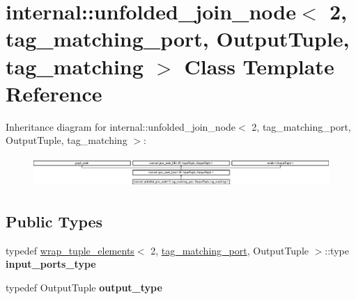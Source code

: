 \hypertarget{classinternal_1_1unfolded__join__node_3_012_00_01tag__matching__port_00_01OutputTuple_00_01tag__matching_01_4}{}\section{internal\+:\+:unfolded\+\_\+join\+\_\+node$<$ 2, tag\+\_\+matching\+\_\+port, Output\+Tuple, tag\+\_\+matching $>$ Class Template Reference}
\label{classinternal_1_1unfolded__join__node_3_012_00_01tag__matching__port_00_01OutputTuple_00_01tag__matching_01_4}
Inheritance diagram for internal\+:\+:unfolded\+\_\+join\+\_\+node$<$ 2, tag\+\_\+matching\+\_\+port, Output\+Tuple, tag\+\_\+matching $>$\+:\begin{figure}[H]
\begin{center}
\leavevmode
\includegraphics[height=1.161826cm]{classinternal_1_1unfolded__join__node_3_012_00_01tag__matching__port_00_01OutputTuple_00_01tag__matching_01_4}
\end{center}
\end{figure}
\subsection*{Public Types}
\begin{DoxyCompactItemize}
\item 
\hypertarget{classinternal_1_1unfolded__join__node_3_012_00_01tag__matching__port_00_01OutputTuple_00_01tag__matching_01_4_af8b917b7de9a2eb9d8c2f3a05a3aa03a}{}typedef \hyperlink{structinternal_1_1wrap__tuple__elements}{wrap\+\_\+tuple\+\_\+elements}$<$ 2, \hyperlink{classinternal_1_1tag__matching__port}{tag\+\_\+matching\+\_\+port}, Output\+Tuple $>$\+::type {\bfseries input\+\_\+ports\+\_\+type}\label{classinternal_1_1unfolded__join__node_3_012_00_01tag__matching__port_00_01OutputTuple_00_01tag__matching_01_4_af8b917b7de9a2eb9d8c2f3a05a3aa03a}

\item 
\hypertarget{classinternal_1_1unfolded__join__node_3_012_00_01tag__matching__port_00_01OutputTuple_00_01tag__matching_01_4_a1f0f3c62ebd18bbc5bc1e67f6f5106cb}{}typedef Output\+Tuple {\bfseries output\+\_\+type}\label{classinternal_1_1unfolded__join__node_3_012_00_01tag__matching__port_00_01OutputTuple_00_01tag__matching_01_4_a1f0f3c62ebd18bbc5bc1e67f6f5106cb}

\end{DoxyCompactItemize}
